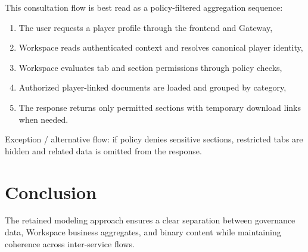 This consultation flow is best read as a policy-filtered aggregation sequence:
\begin{enumerate}
    \item The user requests a player profile through the frontend and Gateway,
    \item Workspace reads authenticated context and resolves canonical player identity,
    \item Workspace evaluates tab and section permissions through policy checks,
    \item Authorized player-linked documents are loaded and grouped by category,
    \item The response returns only permitted sections with temporary download links when needed.
\end{enumerate}
Exception / alternative flow: if policy denies sensitive sections, restricted
tabs are hidden and related data is omitted from the response.



\section*{Conclusion}

The retained modeling approach ensures a clear separation between governance
data, Workspace business aggregates, and binary content while maintaining
coherence across inter-service flows.

